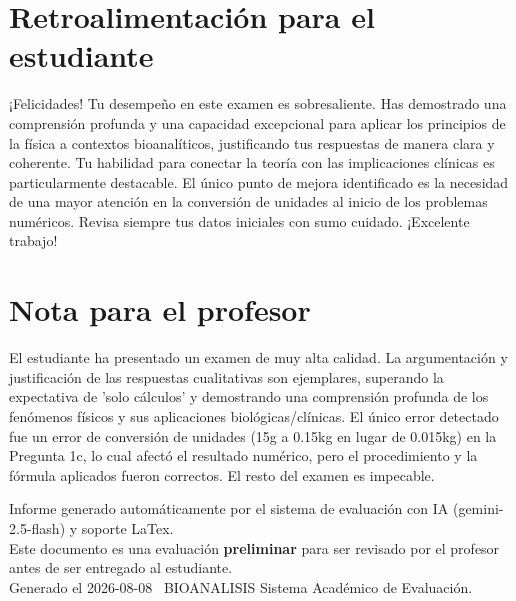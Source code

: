 \documentclass[11pt,a4paper]{article}
\begin{document}
\section*{Retroalimentación para el estudiante}
\begin{tcolorbox}[cajaRecomendacion, title={Dirigido a: Franyerika Rodriguez}]
¡Felicidades! Tu desempeño en este examen es sobresaliente. Has demostrado una comprensión profunda y una capacidad excepcional para aplicar los principios de la física a contextos bioanalíticos, justificando tus respuestas de manera clara y coherente. Tu habilidad para conectar la teoría con las implicaciones clínicas es particularmente destacable. El único punto de mejora identificado es la necesidad de una mayor atención en la conversión de unidades al inicio de los problemas numéricos. Revisa siempre tus datos iniciales con sumo cuidado. ¡Excelente trabajo!
\end{tcolorbox}

\section*{Nota para el profesor}
\begin{tcolorbox}[
  enhanced, breakable,
  colback=yellow!8, colframe=yellow!60!black,
  fonttitle=\bfseries, coltitle=black,
  title={Observaciones para revisión manual},
  top=4pt, bottom=4pt, left=8pt, right=8pt,
]
El estudiante ha presentado un examen de muy alta calidad. La argumentación y justificación de las respuestas cualitativas son ejemplares, superando la expectativa de 'solo cálculos' y demostrando una comprensión profunda de los fenómenos físicos y sus aplicaciones biológicas/clínicas. El único error detectado fue un error de conversión de unidades (15g a 0.15kg en lugar de 0.015kg) en la Pregunta 1c, lo cual afectó el resultado numérico, pero el procedimiento y la fórmula aplicados fueron correctos. El resto del examen es impecable.
\end{tcolorbox}

\vspace{12pt}
\begin{center}
  \footnotesize\color{gray}
  Informe generado automáticamente por el sistema de evaluación con IA (gemini-2.5-flash) y soporte LaTex. \\
  Este documento es una evaluación \textbf{preliminar} para ser revisado por el profesor antes de ser entregado al 
  estudiante. \\
  Generado el 2026-08-08 \textbullet\ BIOANALISIS Sistema Académico de Evaluación.
  \end{center}
\end{document}
